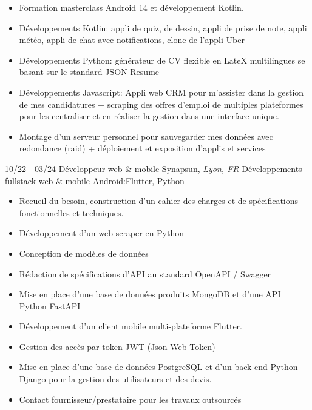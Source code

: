 \documentclass[]{friggeri-cv}
\begin{document}
\vspace{0.5mm}
\begin{itemize}
\setlength{\itemsep}{1pt}
\setlength{\parskip}{0pt}
\setlength{\parsep}{0pt}

\item Formation masterclass Android 14 et développement Kotlin.
\item Développements Kotlin: appli de quiz, de dessin, appli de prise de note, appli météo, appli de chat avec notifications, clone de l'appli Uber
\item Développements Python: générateur de CV flexible en LateX multilingues se basant sur le standard JSON Resume
\item Développements Javascript: Appli web CRM pour m'assister dans la gestion de mes candidatures + scraping des offres d'emploi de multiples plateformes pour les centraliser et en réaliser la gestion dans une interface unique.
\item Montage d'un serveur personnel pour sauvegarder mes données avec redondance (raid) + déploiement et exposition d'applis et services
\end{itemize}

\begin{entrylist}
  \entry
    {10/22 - 03/24}
    {Développeur web \& mobile}
    {Synapsun, \textit{Lyon, FR}}
    {Développements fullstack web \& mobile Android:\hspace*{8mm}Flutter, Python}
\end{entrylist}
\vspace{-15pt}

\vspace{0.5mm}
\begin{itemize}
\setlength{\itemsep}{1pt}
\setlength{\parskip}{0pt}
\setlength{\parsep}{0pt}

\item Recueil du besoin, construction d'un cahier des charges et de spécifications fonctionnelles et techniques.
\item Développement d'un web scraper en Python
\item Conception de modèles de données
\item Rédaction de spécifications d'API au standard OpenAPI / Swagger
\item Mise en place d'une base de données produits MongoDB et d'une API Python FastAPI
\item Développement d'un client mobile multi-plateforme Flutter.
\item Gestion des accès par token JWT (Json Web Token)
\item Mise en place d'une base de données PostgreSQL et d'un back-end Python Django pour la gestion des utilisateurs et des devis.
\item Contact fournisseur/prestataire pour les travaux outsourcés
\end{itemize}
\end{document}
